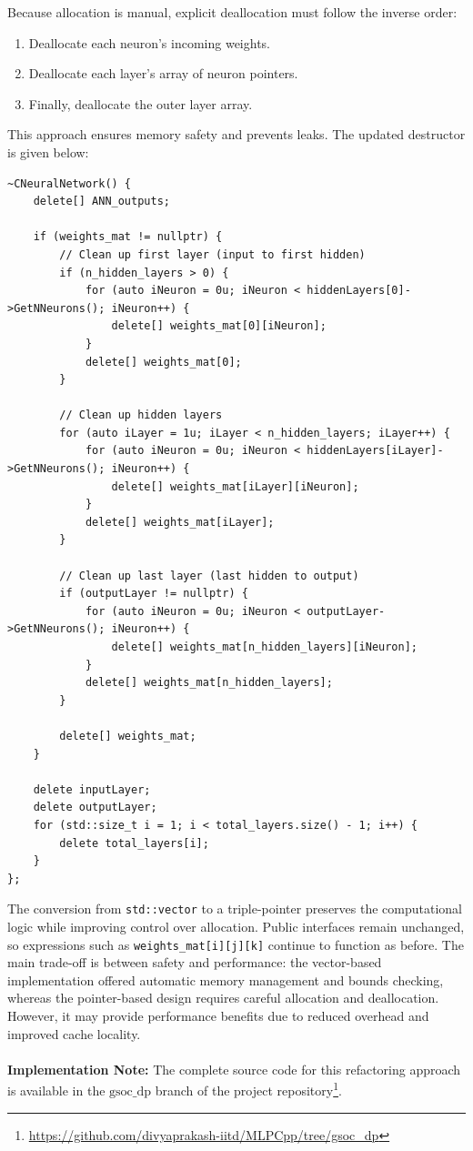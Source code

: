 \documentclass{article}
\begin{document}
Because allocation is manual, explicit deallocation must follow the inverse order:
\begin{enumerate}
  \item Deallocate each neuron's incoming weights.
  \item Deallocate each layer's array of neuron pointers.
  \item Finally, deallocate the outer layer array.
\end{enumerate}
This approach ensures memory safety and prevents leaks. The updated destructor is given below:

\begin{verbatim}
~CNeuralNetwork() {
    delete[] ANN_outputs;
   
    if (weights_mat != nullptr) {
        // Clean up first layer (input to first hidden)
        if (n_hidden_layers > 0) {
            for (auto iNeuron = 0u; iNeuron < hiddenLayers[0]->GetNNeurons(); iNeuron++) {
                delete[] weights_mat[0][iNeuron];
            }
            delete[] weights_mat[0];
        }
       
        // Clean up hidden layers
        for (auto iLayer = 1u; iLayer < n_hidden_layers; iLayer++) {
            for (auto iNeuron = 0u; iNeuron < hiddenLayers[iLayer]->GetNNeurons(); iNeuron++) {
                delete[] weights_mat[iLayer][iNeuron];
            }
            delete[] weights_mat[iLayer];
        }
       
        // Clean up last layer (last hidden to output)
        if (outputLayer != nullptr) {
            for (auto iNeuron = 0u; iNeuron < outputLayer->GetNNeurons(); iNeuron++) {
                delete[] weights_mat[n_hidden_layers][iNeuron];
            }
            delete[] weights_mat[n_hidden_layers];
        }
       
        delete[] weights_mat;
    }
   
    delete inputLayer;
    delete outputLayer;
    for (std::size_t i = 1; i < total_layers.size() - 1; i++) {
        delete total_layers[i];
    }
};
\end{verbatim}

The conversion from \texttt{std::vector} to a triple-pointer preserves the computational logic while improving control over allocation. Public interfaces remain unchanged, so expressions such as \texttt{weights\_mat[i][j][k]} continue to function as before. The main trade-off is between safety and performance: the vector-based implementation offered automatic memory management and bounds checking, whereas the pointer-based design requires careful allocation and deallocation. However, it may provide performance benefits due to reduced overhead and improved cache locality.
\\
\\
\noindent\textbf{Implementation Note:} The complete source code for this refactoring approach is available in the \texttt{$\text{gsoc\_dp}$} branch of the project repository\footnote{\url{https://github.com/divyaprakash-iitd/MLPCpp/tree/gsoc_dp}}.
\end{document}
